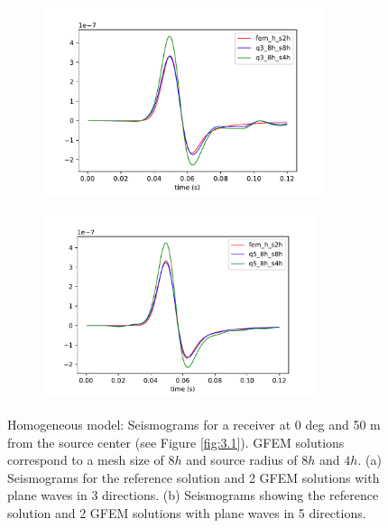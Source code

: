  \begin{figure}[h!]
 		\centering
		\begin{subfigure}{8cm}
				\includegraphics[width=8 cm, height=5.5cm]{Thesis_Edith/figures/homo/homo_waves/fem_q3_8h_r50_0deg.pdf} 
			     \caption{}
		\end{subfigure}
        \hspace{0.25cm}
		\begin{subfigure}{8cm}
				\includegraphics[width=8cm, height=5.5cm]{Thesis_Edith/figures/homo/homo_waves/fem_q5_8h_r50_0deg.pdf}
			   \caption{}
		\end{subfigure}
 
	\caption{Homogeneous model: Seismograms for a receiver at 0 deg and  50 m from the source center  (see Figure \ref{fig:3.1}). GFEM solutions correspond to a mesh size of $8h$ and source radius of  $8h$ and $4h$. (a) Seismograms for the reference solution and 2 GFEM solutions with plane waves in 3 directions. (b) Seismograms showing the reference solution and 2 GFEM solutions with plane waves in 5 directions.}
	\label{fig:3.2}
\end{figure}


